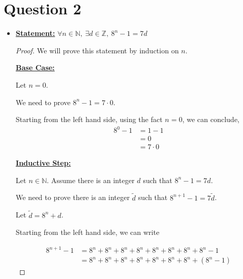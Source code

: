 \documentclass[12pt]{article}
\begin{document}
\section*{Question 2}
\begin{itemize}
    \item

    \underline{\textbf{Statement:}} $\forall n \in \mathbb{N},\:\exists d \in \mathbb{Z},\:8^n-1 = 7d$

    \bigskip

    \begin{proof}

    We will prove this statement by induction on $n$.

    \bigskip

    \underline{\textbf{Base Case:}}

    \bigskip

    Let $n = 0$.

    \bigskip

    We need to prove $8^n-1 = 7 \cdot 0$.

    \bigskip

    Starting from the left hand side, using the fact $n = 0$, we can conclude,
    \setcounter{equation}{0}
    \begin{align}
        8^{0} - 1 &= 1 - 1\\
        &= 0\\
        &= 7 \cdot 0
    \end{align}

    \bigskip

    \underline{\textbf{Inductive Step:}}

    \bigskip

    Let $n \in \mathbb{N}$. Assume there is an integer $d$ such that $8^n-1 = 7d$.

    \bigskip

    We need to prove there is an integer $\tilde{d}$ such that $8^{n+1} - 1 = 7 \tilde{d}$.

    \bigskip

    Let $\tilde{d} = 8^n+d$.

    \bigskip

    Starting from the left hand side, we can write

    \bigskip
    \begin{align}
        8^{n+1} - 1 &= 8^n + 8^n + 8^n + 8^n + 8^n + 8^n + 8^n + 8^n - 1\\
        &= 8^n + 8^n + 8^n + 8^n + 8^n + 8^n + 8^n + (8^n - 1)
    \end{align}


\end{proof}
\end{itemize}
\end{document}
